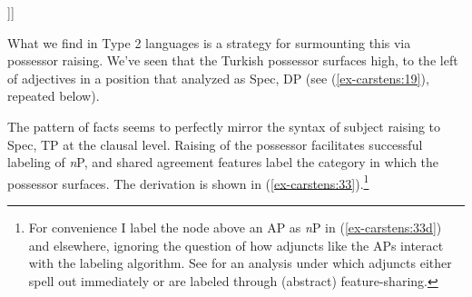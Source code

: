 \documentclass[output=paper
,modfonts
,nonflat]{langsci/langscibook}
\begin{document}
\begin{exe}
\ex *[\textsubscript{$\alpha$} [\textsubscript{XP} possessor] [\textsubscript{YP} \textit{n} [possessed]]]
\end{exe}
What we find in Type 2 languages is a strategy for surmounting this via possessor raising. We’ve seen that the Turkish possessor surfaces high, to the left of adjectives in a position that \citet{Abney1987} analyzed as Spec, DP (see (\ref{ex-carstens:19}), repeated below).

\begin{figure}[!h]
	\begin{exe}
	\end{exe} \vspace{-0.5cm}
\end{figure}
 \noindent
The pattern of facts seems to perfectly mirror the syntax of subject raising to Spec, TP at the clausal level. Raising of the possessor facilitates successful labeling of \textit{n}P, and shared agreement features label the category in which the possessor surfaces. The derivation is shown in (\ref{ex-carstens:33}).\footnote{For convenience I label the node above an AP as \textit{n}P in (\ref{ex-carstens:33d}) and elsewhere, ignoring the question of how adjuncts like the APs interact with the labeling algorithm. See \citet{Oseki2014} for an analysis under which adjuncts either spell out immediately or are labeled through (abstract) feature-sharing.}
\end{document}
